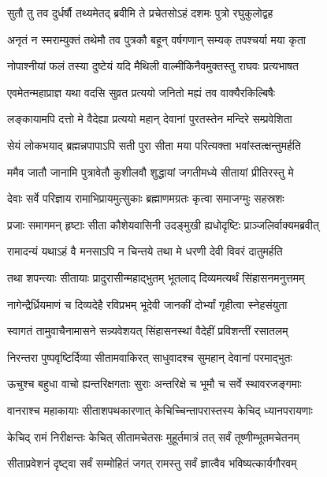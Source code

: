 \twolineshloka
{सुतौ तु तव दुर्धर्षौ तथ्यमेतद् ब्रवीमि ते}
{प्रचेतसोऽहं दशमः पुत्रो रघुकुलोद्वह} %

\twolineshloka
{अनृतं न स्मराम्युक्तं तथेमौ तव पुत्रकौ}
{बहून् वर्षगणान् सम्यक् तपश्चर्या मया कृता} %

\twolineshloka
{नोपाश्नीयां फलं तस्या दुष्टेयं यदि मैथिली}
{वाल्मीकिनैवमुक्तस्तु राघवः प्रत्यभाषत} %

\twolineshloka
{एवमेतन्महाप्राज्ञ यथा वदसि सुव्रत}
{प्रत्ययो जनितो मह्यं तव वाक्यैरकिल्बिषैः} %

\twolineshloka
{लङ्कायामपि दत्तो मे वैदेह्या प्रत्ययो महान्}
{देवानां पुरतस्तेन मन्दिरे सम्प्रवेशिता} %

\twolineshloka
{सेयं लोकभयाद् ब्रह्मन्नपापाऽपि सती पुरा}
{सीता मया परित्यक्ता भवांस्तत्क्षन्तुमर्हति} %

\twolineshloka
{ममैव जातौ जानामि पुत्रावेतौ कुशीलवौ}
{शुद्धायां जगतीमध्ये सीतायां प्रीतिरस्तु मे} %

\twolineshloka
{देवाः सर्वे परिज्ञाय रामाभिप्रायमुत्सुकाः}
{ब्रह्माणमग्रतः कृत्वा समाजग्मुः सहस्रशः} %

\twolineshloka
{प्रजाः समागमन् हृष्टाः सीता कौशेयवासिनी}
{उदङ्मुखी ह्यधोदृष्टिः प्राञ्जलिर्वाक्यमब्रवीत्} %

\twolineshloka
{रामादन्यं यथाऽहं वै मनसाऽपि न चिन्तये}
{तथा मे धरणी देवी विवरं दातुमर्हति} %

\twolineshloka
{तथा शपन्त्याः सीतायाः प्रादुरासीन्महाद्भुतम्}
{भूतलाद् दिव्यमत्यर्थं सिंहासनमनुत्तमम्} %

\twolineshloka
{नागेन्द्रैर्ध्रियमाणं च दिव्यदेहै रविप्रभम्}
{भूदेवी जानकीं दोर्भ्यां गृहीत्वा स्नेहसंयुता} %

\twolineshloka
{स्वागतं तामुवाचैनामासने सन्न्यवेशयत्}
{सिंहासनस्थां वैदेहीं प्रविशन्तीं रसातलम्} %

\twolineshloka
{निरन्तरा पुष्पवृष्टिर्दिव्या सीतामवाकिरत्}
{साधुवादश्च सुमहान् देवानां परमाद्भुतः} %

\twolineshloka
{ऊचुश्च बहुधा वाचो ह्यन्तरिक्षगताः सुराः}
{अन्तरिक्षे च भूमौ च सर्वे स्थावरजङ्गमाः} %

\twolineshloka
{वानराश्च महाकायाः सीताशपथकारणात्}
{केचिच्चिन्तापरास्तस्य केचिद् ध्यानपरायणाः} %

\twolineshloka
{केचिद् रामं निरीक्षन्तः केचित् सीतामचेतसः}
{मुहूर्तमात्रं तत् सर्वं तूष्णीम्भूतमचेतनम्} %

\twolineshloka
{सीताप्रवेशनं दृष्ट्वा सर्वं सम्मोहितं जगत्}
{रामस्तु सर्वं ज्ञात्वैव भविष्यत्कार्यगौरवम्} %

